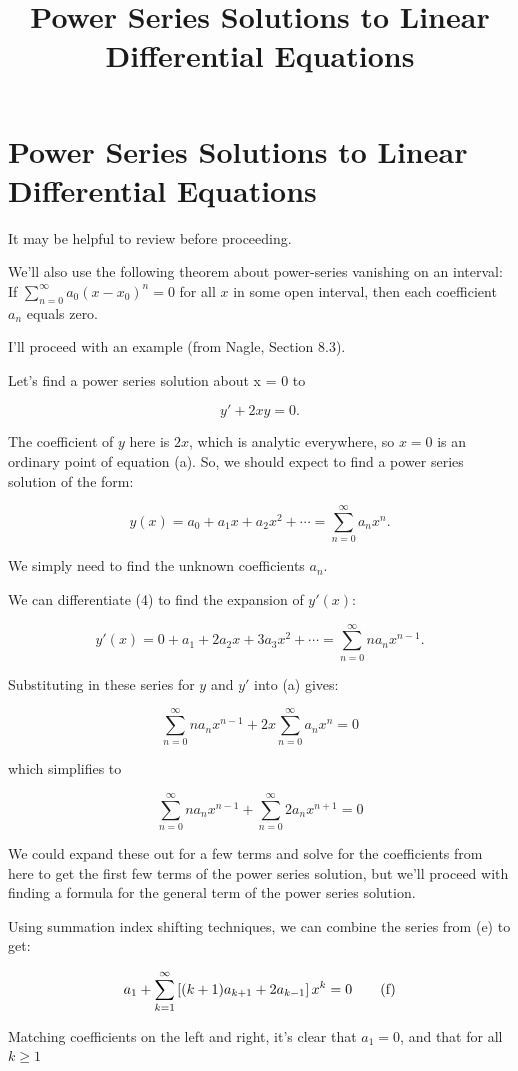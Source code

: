 \documentclass{article}
\title{Power Series Solutions to Linear Differential Equations}
\begin{document}
\section{Power Series Solutions to Linear Differential Equations}

It may be helpful to review  before proceeding. 

We'll also use the following theorem about \@{power-series} vanishing on an interval: If $\sum_{n=0}^{\infty}{a_0(x-x_0)^n} = 0$ for all $x$ in some open interval, then each coefficient $a_n$ equals zero.

I'll proceed with an example (from Nagle, Section 8.3).

Let's find a power series solution about x = 0 to

\[ y' + 2xy = 0. \tag{a} \]

The coefficient of $y$ here is $2x$, which is \@{analytic} everywhere, so $x = 0$ is an ordinary point of equation (a). So, we should expect to find a power series solution of the form:

\[ y(x) = a_0 + a_1 x + a_2 x^2 + \cdots = \sum_{n=0}^{\infty} a_n x^n. \tag{b} \]

We simply need to find the unknown coefficients $a_n$.

We can differentiate (4) to find the expansion of $y'(x)$:

\[ y'(x) = 0 + a_1 + 2a_2 x + 3a_3x^2 + \cdots = \sum_{n=0}^{\infty} n a_n x^{n-1}. \tag{c} \]

Substituting in these series for $y$ and $y'$ into (a) gives:

\[ \sum_{n=0}^{\infty} n a_n x^{n-1} + 2x \sum_{n=0}^{\infty} a_n x^n = 0 \tag{d} \]

which simplifies to

\[ \sum_{n=0}^{\infty} n a_n x^{n-1} + \sum_{n=0}^{\infty} 2 a_n x^{n+1} = 0 \tag{e} \]

We could expand these out for a few terms and solve for the coefficients from here to get the first few terms of the power series solution, but we'll proceed with finding a formula for the general term of the power series solution.

Using summation index shifting techniques, we can combine the series from (e) to get:

\[ a_1 + \sum_{k=1}^{\infty}{ \left[(k+1)a_{k+1} + 2a_{k-1}\right] x^k} = 0 \tag{f} \]

Matching coefficients on the left and right, it's clear that $a_1 = 0$, and that for all $k \geq 1$
\end{document}
